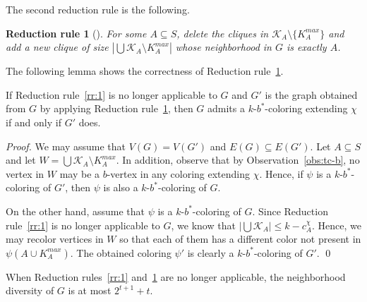 \documentclass[runningheads, envcountsame]{llncs}
\newcommand{\seq}{\subseteq}
\newcommand{\ca}{\mathcal}
\newtheorem{rr}[theorem]{Reduction rule}
\begin{document}
The second reduction rule is the following.

\begin{rr}[{\cite[Reduction Rule 22]{JaffkeLS23}}]\label{rr:2}
For some $A \seq S$, delete the cliques in $\ca K_A \setminus \{K_A^{max}\}$ and add a new clique of size $|\bigcup \ca K_A \setminus K_A^{max}|$ whose neighborhood in $G$ is exactly $A$.
\end{rr}

The following lemma shows the correctness of Reduction rule~\ref{rr:2}.

\begin{lemma}\label{lem:rr2}
If Reduction rule~\ref{rr:1} is no longer applicable to $G$ and $G'$ is the graph obtained from $G$ by applying Reduction rule~\ref{rr:2}, then $G$ admits a $k$-$b^*$-coloring extending $\chi$ if and only if $G'$ does.
\end{lemma}
\begin{proof}
We may assume that $V(G) = V(G')$ and $E(G) \seq E(G')$.
Let $A \seq S$ and let $W = \bigcup \ca K_A \setminus K_A^{max}$.
In addition, observe that by Observation~\ref{obs:tc-b}, no vertex in $W$ may be a $b$-vertex in any coloring extending $\chi$. Hence, if $\psi$ is a $k$-$b^*$-coloring of $G'$, then $\psi$ is also a $k$-$b^*$-coloring of $G$.

On the other hand, assume that $\psi$ is a $k$-$b^*$-coloring of $G$.
Since Reduction rule~\ref{rr:1} is no longer applicable to $G$, we know that $|\bigcup \ca K_A| \le k - c_A^\chi$.
Hence, we may recolor vertices in $W$ so that each of them has a different color not present in $\psi(A \cup K_A^{max})$.
The obtained coloring $\psi'$ is clearly a $k$-$b^*$-coloring of $G'$.
\qed\end{proof}

\begin{lemma}\label{lem:tcn-nd}
When Reduction rules~\ref{rr:1} and~\ref{rr:2} are no longer applicable, the neighborhood diversity of $G$ is at most $2^{t+1} + t$.
\end{lemma}
\end{document}
